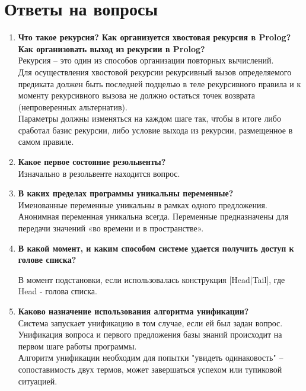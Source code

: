 \newpage
\section*{Ответы на вопросы}
\begin{enumerate}
	\item \textbf{Что такое рекурсия? Как организуется хвостовая рекурсия в Prolog? Как организовать выход из рекурсии в Prolog?}\\
	Рекурсия – это один из способов организации повторных вычислений. \\  
	Для осуществления хвостовой рекурсии рекурсивный вызов определяемого предиката должен быть последней подцелью в теле рекурсивного правила и к моменту рекурсивного вызова не должно остаться точек возврата (непроверенных альтернатив). \\
	Параметры должны изменяться на каждом шаге так, чтобы в итоге либо сработал базис рекурсии, либо условие выхода из рекурсии, размещенное в самом правиле.
	    
	\item \textbf{Какое первое состояние резольвенты?}\\
	Изначально в резольвенте находится вопрос.
	

    \item \textbf{В каких пределах программы уникальны переменные? }\\
	Именованные переменные уникальны в рамках одного предложения. Анонимная переменная уникальна всегда. Переменные предназначены для передачи значений «во времени и в пространстве». 
	
	\item \textbf{В какой момент, и каким способом системе удается получить доступ к голове списка? }
	
	В момент подстановки, если использовалась конструкция [Head|Tail], где Head - голова списка.
	
	\item \textbf{Каково назначение использования алгоритма унификации? }\\ 
Система запускает унификацию в том случае, если ей был задан вопрос. Унификация вопроса и первого предложения базы знаний происходит на первом шаге работы программы. \\
Алгоритм унификации необходим для попытки "увидеть одинаковость" – сопоставимость двух термов, может завершаться успехом или тупиковой ситуацией. 



\end{enumerate}
